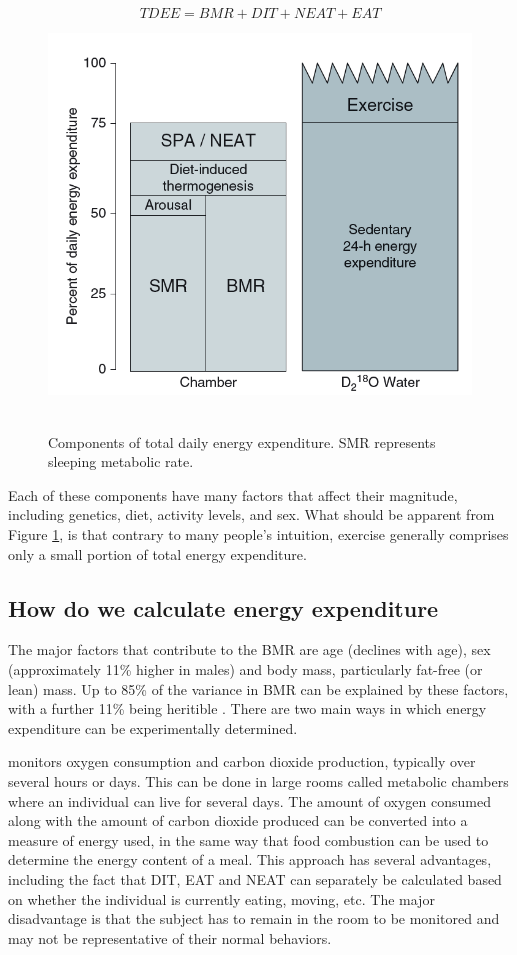 \documentclass{tufte-handout}
\begin{document}
\begin{equation}
TDEE = BMR + DIT + NEAT + EAT
\end{equation}

\begin{figure}
\includegraphics{figures/tdee-components.png}\
\caption{Components of total daily energy expenditure.  SMR represents sleeping metabolic rate.}
\label{fig:tdee-components}
\end{figure}

Each of these components have many factors that affect their magnitude, including genetics, diet, activity levels, and sex.  What should be apparent from Figure \ref{fig:tdee-components}, is that contrary to many people's intuition, exercise generally comprises only a small portion of total energy expenditure.

\subsection{How do we calculate energy expenditure}

The major factors that contribute to the BMR are age (declines with age), sex (approximately 11\% higher in males) and body mass, particularly fat-free (or lean) mass.  Up to 85\% of the variance in BMR can be explained by these factors, with a further 11\% being heritible \cite{Bogardus1986a}.  There are two main ways in which energy expenditure can be experimentally determined.

 monitors oxygen consumption and carbon dioxide production, typically over several hours or days.  This can be done in large rooms called metabolic chambers where an individual can live for several days.  The amount of oxygen consumed along with the amount of carbon dioxide produced can be converted into a measure of energy used, in the same way that food combustion can be used to determine the energy content of a meal.  This approach has several advantages, including the fact that DIT, EAT and NEAT can separately be calculated based on whether the individual is currently eating, moving, etc.  The major disadvantage is that the subject has to remain in the room to be monitored and may not be representative of their normal behaviors.
\end{document}
